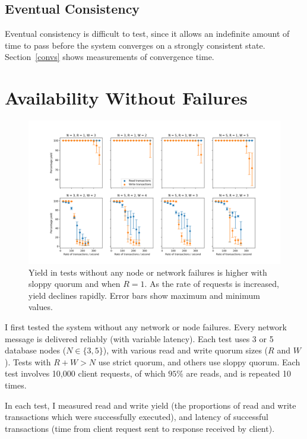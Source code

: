 \documentclass[12pt,a4paper,twoside,openany]{report}
\begin{document}
\subsection{Eventual Consistency}

Eventual consistency is difficult to test, since it allows an indefinite amount of time to pass before the system converges on a strongly consistent state. Section~\ref{convs} shows measurements of convergence time.

\section{Availability Without Failures}

\begin{figure}[hbt]
\centerline{\includegraphics[width=\paperwidth]{figs/eval-fig-1.png}}
\caption{Yield in tests  without any node or network failures is higher with sloppy quorum and when $R = 1$. As the rate of requests is increased, yield declines rapidly. Error bars show maximum and minimum values.}
\label{yield35nofail}
\end{figure}

I first tested the system without any network or node failures. Every network message is delivered reliably (with variable latency). Each test uses 3 or 5 database nodes ($N \in \{3, 5\}$), with various read and write quorum sizes ($R$ and $W$). Tests with $R + W > N$ use strict quorum, and others use sloppy quorum. Each test involves 10,000 client requests, of which $95\%$ are reads, and is repeated 10 times.

In each test, I measured read and write yield (the proportions of read and write transactions which were successfully executed), and latency of successful transactions (time from client request sent to response received by client).
\end{document}
